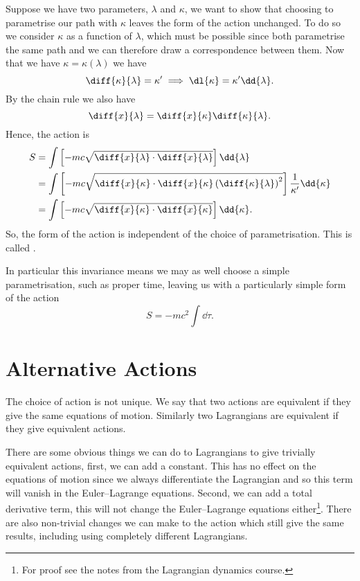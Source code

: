 \documentclass[fleqn]{NotesClass}
\begin{document}
    Suppose we have two parameters, \(\lambda\) and \(\kappa\), we want to show that choosing to parametrise our path with \(\kappa\) leaves the form of the action unchanged.
    To do so we consider \(\kappa\) as a function of \(\lambda\), which must be possible since both parametrise the same path and we can therefore draw a correspondence between them.
    Now that we have \(\kappa = \kappa(\lambda)\) we have
    \begin{equation}
        \diff{\kappa}{\lambda} = \kappa' \implies \dl{\kappa} = \kappa'\dd{\lambda}.
    \end{equation}
    By the chain rule we also have
    \begin{equation}
        \diff{x}{\lambda} = \diff{x}{\kappa}\diff{\kappa}{\lambda}.
    \end{equation}
    Hence, the action is
    \begin{align}
        S &= \int \left[ -mc \sqrt{\diff{x}{\lambda} \cdot \diff{x}{\lambda}} \right] \dd{\lambda}\\
        &= \int \left[ -mc \sqrt{\diff{x}{\kappa} \cdot \diff{x}{\kappa} \left( \diff{\kappa}{\lambda} \right)^2} \right] \frac{1}{\kappa'} \dd{\kappa}\\
        &= \int \left[ -mc \sqrt{\diff{x}{\kappa} \cdot \diff{x}{\kappa}} \right] \dd{\kappa}.
    \end{align}
    So, the form of the action is independent of the choice of parametrisation.
    This is called .
    
    In particular this invariance means we may as well choose a simple parametrisation, such as proper time, leaving us with a particularly simple form of the action
    \begin{equation}
        S = -mc^2 \int \dd{\tau}.
    \end{equation}
    
    \chapter{Alternative Actions}
    The choice of action is not unique.
    We say that two actions are equivalent if they give the same equations of motion.
    Similarly two Lagrangians are equivalent if they give equivalent actions.
    
    There are some obvious things we can do to Lagrangians to give trivially equivalent actions, first, we can add a constant.
    This has no effect on the equations of motion since we always differentiate the Lagrangian and so this term will vanish in the Euler--Lagrange equations.
    Second, we can add a total derivative term, this will not change the Euler--Lagrange equations either\footnote{For proof see the notes from the Lagrangian dynamics course.}.
    There are also non-trivial changes we can make to the action which still give the same results, including using completely different Lagrangians.
    
\end{document}
